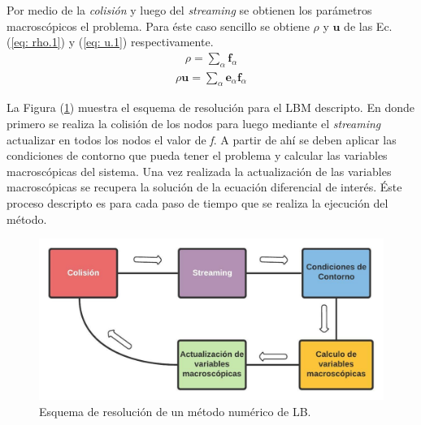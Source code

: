 Por medio de la \textit{colisión} y luego del \textit{streaming} se obtienen los parámetros macroscópicos el problema. Para éste caso sencillo se obtiene $\rho$ y $\mathbf{u}$ de las Ec. (\ref{eq: rho.1}) y (\ref{eq: u.1}) respectivamente.
\begin{align}
	\rho = \sum_{\alpha} \mathbf{f}_{\alpha}
	\label{eq: rho.1}
\end{align}
\begin{align}
	\rho \mathbf{u}= \sum_{\alpha} \mathbf{e}_{\alpha} \mathbf{f}_{\alpha}
	\label{eq: u.1}
\end{align}

La Figura (\ref{fig:esquema_lbm}) muestra el esquema de resolución para el LBM descripto. En donde primero se realiza la colisión de los nodos para luego mediante el \textit{streaming} actualizar en todos los nodos el valor de \textit{f}. A partir de ahí se deben aplicar las condiciones de contorno que pueda tener el problema y calcular las variables macroscópicas del sistema. Una vez realizada la actualización de las variables macroscópicas se recupera la solución de la ecuación diferencial de interés. Éste proceso descripto es para cada paso de tiempo que se realiza la ejecución del método.

%

\begin{figure}[h!]
	\centering
	\includegraphics[width=12cm]{figs/cap1/esquema_LBM}
	\caption{Esquema de resolución de un método numérico de LB.}
	\label{fig:esquema_lbm}
\end{figure}

